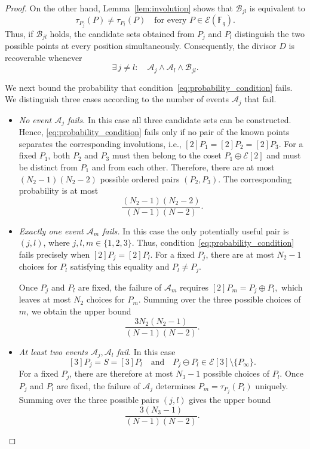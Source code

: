 \documentclass[sn-mathphys-num]{sn-jnl_modified}
\newcommand{\FF}{\ensuremath{\mathbb{F}}}
\begin{document}
\begin{proof}
On the other hand, Lemma~\ref{lem:involution} shows that
$\mathcal{B}_{jl}$ is equivalent to
\[
\tau_{P_j}(P)\neq\tau_{P_l}(P)
\quad\text{for every }P\in\mathcal{E}(\FF_q).
\]
Thus, if $\mathcal{B}_{jl}$ holds, the candidate sets obtained from $P_j$ and $P_l$ distinguish the two possible points at every position simultaneously. Consequently, the divisor $D$ is recoverable whenever
\begin{equation}\label{eq:probability_condition}
 \exists\, j\neq l:\quad
 \mathcal{A}_j\wedge\mathcal{A}_l\wedge\mathcal{B}_{jl}.
\end{equation}

We next bound the probability that condition~\eqref{eq:probability_condition} fails. We distinguish three cases according to the number of events $\mathcal{A}_j$ that fail.


\begin{itemize}
\item \emph{No event $\mathcal{A}_j$ fails.}
In this case all three candidate sets can be constructed. Hence, \eqref{eq:probability_condition} fails only if no pair of the known points separates the corresponding involutions, i.e., $[2]P_1=[2]P_2=[2]P_3$. For a fixed $P_1$, both $P_2$ and $P_3$ must then belong to the coset $P_1\oplus\mathcal{E}[2]$ and must be distinct from $P_1$ and from each other. Therefore, there are at most $(N_2-1)(N_2-2)$ possible ordered pairs $(P_2,P_3)$. The corresponding probability is
at most
\[
\frac{(N_2-1)(N_2-2)}
{(N-1)(N-2)}.
\]

\item \emph{Exactly one event $\mathcal{A}_m$ fails.}
In this case the only potentially useful pair is $(j,l)$, where
$j,l,m \in \{1,2,3\}$. Thus, condition~\eqref{eq:probability_condition} fails precisely when $[2]P_j = [2]P_l$. For a fixed $P_j$, there are at most $N_2-1$ choices for $P_l$ satisfying this equality and $P_l \neq P_j$. 

Once $P_j$ and $P_l$ are fixed, the failure of $\mathcal{A}_m$ requires $[2]P_m = P_j \oplus P_l ,$ which leaves at most $N_2$ choices for $P_m$. Summing over the three possible choices of $m$, we obtain the upper bound
\[
\frac{3N_2(N_2-1)}{(N-1)(N-2)} .
\]




\item \emph{At least two events $\mathcal{A}_j,\mathcal{A}_l$ fail.} In this case
\[
[3]P_j=S=[3]P_l \quad \text{and} \quad P_j\ominus P_l\in\mathcal{E}[3]\setminus\{P_\infty\}.
\]
For a fixed $P_j$, there are therefore at most $N_3-1$ possible choices of $P_l$. Once $P_j$ and $P_l$ are fixed, the failure of $\mathcal{A}_j$ determines $P_m=\tau_{P_j}(P_l)$ uniquely. Summing over the three possible pairs $(j,l)$ gives the upper bound
\[
\frac{3(N_3-1)}
{(N-1)(N-2)}.
\]
\end{itemize}


\end{proof}
\end{document}
